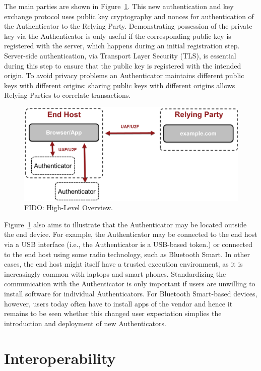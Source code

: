 \documentclass[peerreview, a4paper, 7pt]{IEEEtran}
\begin{document}
The main parties are shown in Figure~\ref{fido-overview-figure}. This new authentication and key exchange protocol uses public key cryptography and nonces for authentication of the Authenticator to the Relying Party. Demonstrating possession of the private key via the Authenticator is only useful if the corresponding public key is registered with the server, which happens during an initial registration step. Server-side authentication, via Transport Layer Security (TLS), is essential during this step to ensure that the public key is registered with the intended origin. To avoid privacy problems an Authenticator maintains different public keys with different origins: sharing public keys with different origins allows Relying Parties to correlate transactions. 

\begin{figure}[!htbp]
 \centering
 \includegraphics[scale=0.30]{architecture.eps}
 \caption{FIDO: High-Level Overview.}
\label{fido-overview-figure}
\end{figure}

Figure~\ref{fido-overview-figure} also aims to illustrate that the Authenticator may be located outside the end device. For example, the Authenticator may be connected to the end host via a USB interface (i.e., the Authenticator is a USB-based token.) or connected to the end host using some radio technology, such as Bluetooth Smart. In other cases, the end host might itself have a trusted execution environment, as it is increasingly common with laptops and smart phones. Standardizing the communication with the Authenticator is only important if users are unwilling to install software for individual Authenticators. For Bluetooth Smart-based devices, however, users today often have to install apps of the vendor and hence it remains to be seen whether this changed user expectation simplies the introduction and deployment of new Authenticators. 
 
\section{Interoperability}
\end{document}
